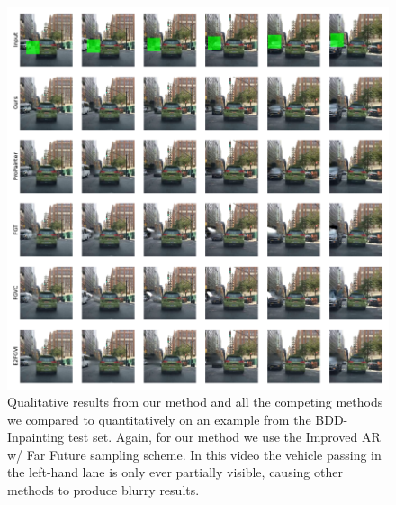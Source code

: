     
    
\begin{figure}
\begin{center}
    \centering
    \captionsetup{type=figure}
    \includegraphics[width=\linewidth]{figures/additional-samples/taxi_all.pdf}
    \caption[Qualitative results from our method and all competing methods on an example from the BDD-Inpainting test set.]{Qualitative results from our method and all the competing methods we compared to quantitatively on an example from the BDD-Inpainting test set. Again, for our method we use the Improved AR w/ Far Future sampling scheme. In this video the vehicle passing in the left-hand lane is only ever partially visible, causing other methods to produce blurry results. }
    \label{fig:taxi}
\end{center}
\end{figure}


